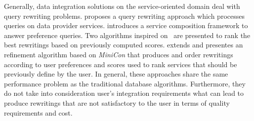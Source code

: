 Generally, data integration solutions on the service-oriented domain deal with
query rewriting problems. \cite{Barhamgi2010} proposes a query rewriting approach which processes queries on data provider services.
%
\cite{Benouaret2011} introduces a service composition framework to answer
preference queries. Two algorithms inspired on~\cite{Barhamgi2010} are presented to rank the best rewritings based on previously computed scores.
%
\cite{ba2014} extends \cite{Umberto} and presentes an refinement algorithm based
on \textit{MiniCon} that produces and order rewritings according to user preferences and scores used to rank services that should be previously define by the user.
In general, these approaches share the same performance problem as the traditional database algorithms. Furthermore, they do not take into consideration user's integration requirements what can lead to produce rewritings that are not satisfactory to the user in terms of quality requirements and cost.

%

%


